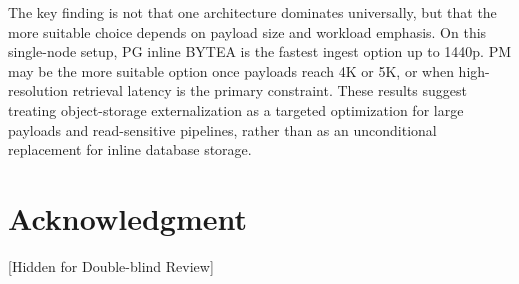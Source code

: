 \documentclass[conference, a4paper]{IEEEtran}
\begin{document}
The key finding is not that one architecture dominates universally, but that the more suitable choice depends on payload size and workload emphasis. On this single-node setup, PG inline BYTEA is the fastest ingest option up to 1440p. PM may be the more suitable option once payloads reach 4K or 5K, or when high-resolution retrieval latency is the primary constraint. These results suggest treating object-storage externalization as a targeted optimization for large payloads and read-sensitive pipelines, rather than as an unconditional replacement for inline database storage.


\section*{Acknowledgment}
[Hidden for Double-blind Review]




\end{document}
